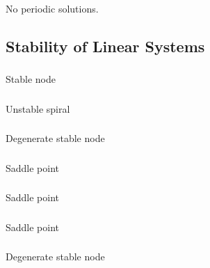 \documentclass{article}
\begin{document}
\setcounter{subsubsection}{26}
\subsubsection{}

No periodic solutions.

\subsection{Stability of Linear Systems}

\subsubsection{}

Stable node

\setcounter{subsubsection}{2}
\subsubsection{}

Unstable spiral

\setcounter{subsubsection}{4}
\subsubsection{}

Degenerate stable node

\setcounter{subsubsection}{6}
\subsubsection{}

Saddle point

\setcounter{subsubsection}{8}
\subsubsection{}

Saddle point

\setcounter{subsubsection}{10}
\subsubsection{}

Saddle point

\setcounter{subsubsection}{12}
\subsubsection{}

Degenerate stable node
\end{document}
